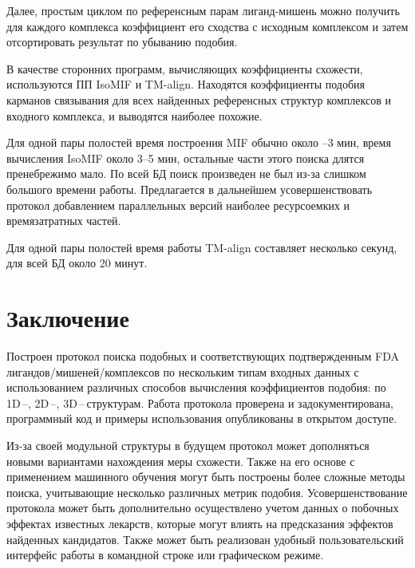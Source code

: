 \documentclass[a4paper,14pt]{article}         %
\begin{document}
Далее, простым циклом по референсным парам лиганд-мишень можно получить для каждого комплекса коэффициент его сходства с исходным комплексом и затем отсортировать результат по убыванию подобия.

В качестве сторонних программ, вычисляющих коэффициенты схожести, используются ПП IsoMIF и TM-align. Находятся коэффициенты подобия карманов связывания для всех найденных референсных структур комплексов и входного комплекса, и выводятся наиболее похожие.

Для одной пары полостей время построения MIF обычно около --3 мин, время вычисления IsoMIF около 3--5 мин, остальные части этого поиска длятся пренебрежимо мало. По всей БД поиск произведен не был из-за слишком большого времени работы. Предлагается в дальнейшем усовершенствовать протокол добавлением параллельных версий наиболее ресурсоемких и времязатратных частей.

Для одной пары полостей время работы TM-align составляет несколько секунд, для всей БД около 20 минут.

\newpage
\section{Заключение}
Построен протокол поиска подобных и соответствующих подтвержденным FDA лигандов/мишеней/комплексов по нескольким типам входных данных с использованием различных способов вычисления коэффициентов подобия: по 1D\,--, 2D\,--, 3D\,--\,структурам. Работа протокола проверена и задокументирована, программный код и примеры использования опубликованы в открытом доступе.

Из-за своей модульной структуры в будущем протокол может дополняться новыми вариантами нахождения меры схожести. Также на его основе с применением машинного обучения могут быть построены более сложные методы поиска, учитывающие несколько различных метрик подобия. Усовершенствование протокола может быть дополнительно осуществлено учетом данных о побочных эффектах известных лекарств, которые могут влиять на предсказания эффектов найденных кандидатов. Также может быть реализован удобный пользовательский интерфейс работы в командной строке или графическом режиме.


\newpage
\printbibliography[heading=bibintoc, title=Список использованных источников]
\end{document}
